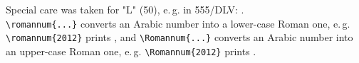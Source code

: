 \documentclass[british]{article}[2007/10/19]%
\begin{document}
Special care was taken for "L" (50), e.\,g. in 555/DLV: .\\

\verb|\romannum{...}| converts an Arabic number into a lower-case Roman one,
e.\,g. \verb|\romannum{2012}| prints , and
\verb|\Romannum{...}| converts an Arabic number into an upper-case Roman one,
e.\,g. \verb|\Romannum{2012}| prints .
\end{document}

